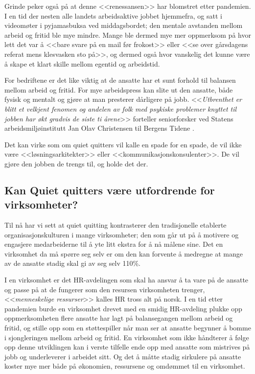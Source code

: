 \documentclass[a4paper, 12pt]{article}  %
\begin{document}
Grinde peker også på at denne <<renessansen>> har blomstret etter pandemien.
I en tid der nesten alle landets arbeidsaktive jobbet hjemmefra, og satt i videomøter i pyjamasbuksa ved middagsbordet; den mentale avstanden mellom arbeid og fritid ble mye mindre. 
Mange ble dermed mye mer oppmerksom på hvor lett det var å <<bare svare på en mail før frokost>> eller <<se over gårsdagens referat mens klesvasken sto på>>,
og dermed også hvor vanskelig det kunne være å skape et klart skille mellom egentid og arbeidstid. 

For bedriftene er det like viktig at de ansatte har et sunt forhold til balansen mellom arbeid og fritid. For mye arbeidspress kan slite ut den ansatte, både fysisk og mentalt og gjøre at man presterer dårligere på jobb. <<\emph{Utbrenthet er blitt et velkjent fenomen og andelen av folk med psykiske problemer knyttet til jobben har økt gradvis de siste ti årene}>> forteller seniorforsker ved Statens arbeidsmiljøinstitutt Jan Olav Christensen til Bergens Tidene \parencite{bt22}.

Det kan virke som om quiet quitters vil kalle en spade for en spade, de vil ikke være <<løsningsarkitekter>> eller <<kommunikasjonskonsulenter>>. 
De vil gjøre den jobben de trengs til, og holde det der.

\subsection{Kan Quiet quitters være utfordrende for virksomheter?}

Til nå har vi sett at quiet quitting kontrasterer den tradisjonelle etablerte organisasjonskulturen i mange virksomheter; 
den som går ut på å motivere og engasjere medarbeiderne til å yte litt ekstra for å nå målene sine.
Det en virksomhet da må spørre seg selv er om den kan forvente å medregne at mange av de ansatte stadig skal gi av seg selv 110\%. 

I en virksomhet er det HR-avdelingen som skal ha ansvar å ta vare på de ansatte og passe på at de fungerer som den resursen virksomheten trenger, <<\emph{menneskelige ressurser}>> kalles HR tross alt på norsk. 
I en tid etter pandemien burde en virksomhet drevet med en smidig HR-avdeling plukke opp oppmerksomheten flere ansatte har lagt på balansegangen mellom arbeid og fritid, og stille opp som en støttespiller når man ser at ansatte begynner å bomme i sjongleringen mellom arbeid og fritid. 
En virksomhet som ikke håndterer å følge opp denne utviklingen kan i verste tilfelle ende opp med ansatte som mistrives på jobb og underleverer i arbeidet sitt.
Og det å måtte stadig sirkulere på ansatte koster mye mer både på økonomien, ressursene og omdømmet til en virksomhet.
\end{document}
